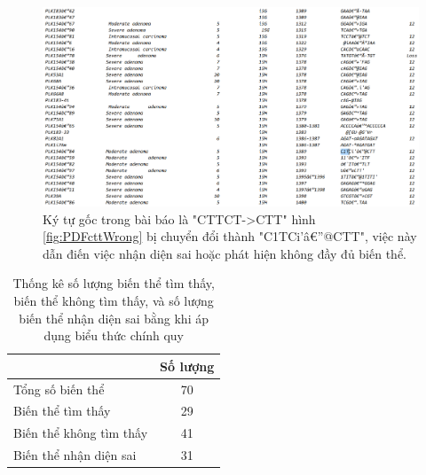 \documentclass[../DoAn.tex]{subfiles}
\begin{document}
\begin{figure}
\centering
\includegraphics[width=1.0\linewidth]{Hinh_ve/TXTcttWrong.png}
\caption{Ký tự gốc trong bài báo là "CTTCT->CTT" hình \ref{fig:PDFcttWrong}  bị chuyển đổi thành "C1TCi'â€”@CTT", việc này dẫn điến việc nhận diện sai hoặc phát hiện không đầy đủ biến thể.}
\label{fig:TXTcttWrong}
\end{figure}


\begin{table}[]
\centering
\caption{Thống kê số lượng biến thể tìm thấy, biến thể không tìm thấy, và số lượng biến thể nhận diện sai bằng khi áp dụng biểu thức chính quy}
\label{tab:wrong_cvt}
\begin{tabular}{@{}|l|c|@{}}
\toprule
                        & \multicolumn{1}{l|}{Số lượng} \\ \midrule
Tổng số biến thể        & 70                            \\ \midrule
Biến thể tìm thấy       & 29                            \\ \midrule
Biến thể không tìm thấy & 41                            \\ \midrule
Biến thể nhận diện sai  & 31                            \\ \bottomrule
\end{tabular}
\end{table}
\end{document}
